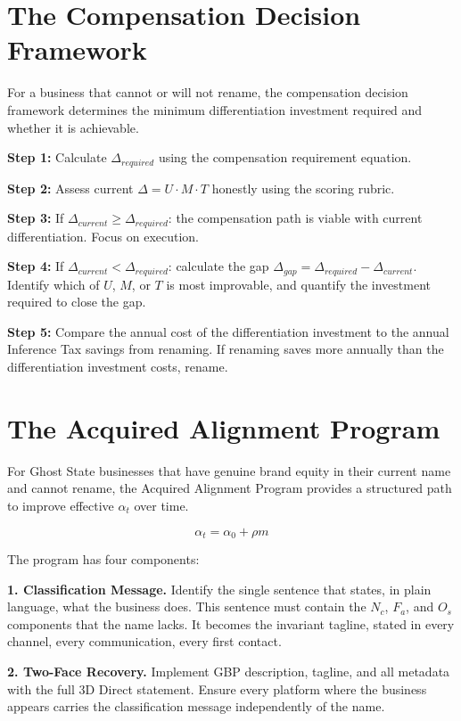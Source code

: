 \documentclass[12pt, openany]{book}
\theoremstyle{thmstyle}
\theoremstyle{defstyle}
\begin{document}
\section{The Compensation Decision Framework}

For a business that cannot or will not rename, the compensation decision framework determines the minimum differentiation investment required and whether it is achievable.

\textbf{Step 1:} Calculate $\Delta_{required}$ using the compensation requirement equation.

\textbf{Step 2:} Assess current $\Delta = U \cdot M \cdot T$ honestly using the scoring rubric.

\textbf{Step 3:} If $\Delta_{current} \geq \Delta_{required}$: the compensation path is viable with current differentiation. Focus on execution.

\textbf{Step 4:} If $\Delta_{current} < \Delta_{required}$: calculate the gap $\Delta_{gap} = \Delta_{required} - \Delta_{current}$. Identify which of $U$, $M$, or $T$ is most improvable, and quantify the investment required to close the gap.

\textbf{Step 5:} Compare the annual cost of the differentiation investment to the annual Inference Tax savings from renaming. If renaming saves more annually than the differentiation investment costs, rename.

\section{The Acquired Alignment Program}

For Ghost State businesses that have genuine brand equity in their current name and cannot rename, the Acquired Alignment Program provides a structured path to improve effective $\alpha_t$ over time.

\[
\alpha_t = \alpha_0 + \rho m
\]

The program has four components:

\textbf{1. Classification Message.} Identify the single sentence that states, in plain language, what the business does. This sentence must contain the $N_c$, $F_a$, and $O_s$ components that the name lacks. It becomes the invariant tagline, stated in every channel, every communication, every first contact.

\textbf{2. Two-Face Recovery.} Implement GBP description, tagline, and all metadata with the full 3D Direct statement. Ensure every platform where the business appears carries the classification message independently of the name.
\end{document}
